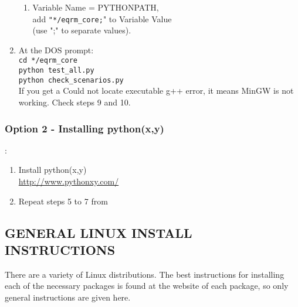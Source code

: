 \documentclass[a4paper, 12pt]{article}
\begin{document}
\begin{enumerate}
\begin{enumerate}
\item Variable Name = PYTHONPATH, \\
add \texttt{"*/eqrm\_core;}" to Variable Value \\
(use ";" to separate values).
\end{enumerate}

\item At the DOS prompt: \\
\texttt{cd */eqrm\_core} \\
\texttt{python test\_all.py} \\
\texttt{python check\_scenarios.py} \\
If you get a Could not locate executable g++ error, it means MinGW
is not working.  Check steps 9 and 10.
\end{enumerate}
%
%
%
\subsubsection{Option 2 - Installing python(x,y)}:
\label{sec:windows-option2}

\begin{enumerate}
\item Install python(x,y) \\
\url{http://www.pythonxy.com/}
\item Repeat steps 5 to 7 from 
\end{enumerate}


\subsection{GENERAL LINUX INSTALL INSTRUCTIONS}

There are a variety of Linux distributions.  The best instructions
for installing each of the necessary packages is found at the
website of each package, so only general instructions are given
here.
\end{document}
